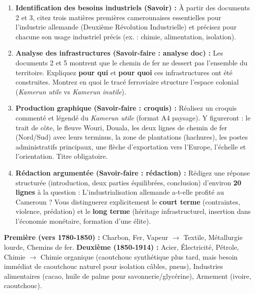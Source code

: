 \documentclass[11pt]{article}
\newcommand{\cle}[1]{{\popxbold\color{popdark}#1}}
\newcounter{popsec}
\newcounter{popsub}
\newcommand{\courssub}[1]{%
  \stepcounter{popsub}%
  \par\vspace{9pt}\noindent{\popxbold\fontsize{11.5}{13}\selectfont\color{popink}{\color{poporange}\thepopsec.\thepopsub}\hspace{6pt}#1}\par\nopagebreak\vspace{4pt}
}
\begin{document}
\begin{enumerate}
    \item \textbf{Identification des besoins industriels (Savoir) :} À partir des documents 2 et 3, citez trois matières premières camerounaises essentielles pour l'industrie allemande (\cle{Deuxième Révolution Industrielle}) et précisez pour chacune son usage industriel précis (ex. : chimie, alimentation, isolation).
    \item \textbf{Analyse des infrastructures (Savoir-faire : analyse doc) :} Les documents 2 et 5 montrent que le chemin de fer ne dessert pas l'ensemble du territoire. Expliquez \textbf{pour qui} et \textbf{pour quoi} ces infrastructures ont été construites. Montrez en quoi le tracé ferroviaire structure l'espace colonial (\emph{Kamerun utile} vs \emph{Kamerun inutile}).
    \item \textbf{Production graphique (Savoir-faire : croquis) :} Réalisez un croquis commenté et légendé du \emph{Kamerun utile} (format A4 paysage). Y figureront : le trait de côte, le fleuve Wouri, Douala, les deux lignes de chemin de fer (Nord/Sud) avec leurs terminus, la zone de plantations (hachures), les postes administratifs principaux, une flèche d'exportation vers l'Europe, l'échelle et l'orientation. Titre obligatoire.
    \item \textbf{Rédaction argumentée (Savoir-faire : rédaction) :} Rédigez une réponse structurée (introduction, deux parties équilibrées, conclusion) d'environ \textbf{20 lignes} à la question : \og L'industrialisation allemande a-t-elle profité au Cameroun ? \fg Vous distinguerez explicitement le \textbf{court terme} (contraintes, violence, prédation) et le \textbf{long terme} (héritage infrastructurel, insertion dans l'économie monétaire, formation d'une élite).
\end{enumerate}

\courssub{Ressources à mobiliser}
\begin{definition}
\textbf{Première (vers 1780-1850) :} Charbon, Fer, Vapeur $\rightarrow$ Textile, Métallurgie lourde, Chemins de fer.
\textbf{Deuxième (1850-1914) :} Acier, Électricité, Pétrole, Chimie $\rightarrow$ Chimie organique (caoutchouc synthétique plus tard, mais besoin immédiat de caoutchouc naturel pour isolation câbles, pneus), Industries alimentaires (cacao, huile de palme pour savonnerie/glycérine), Armement (ivoire, caoutchouc).
\end{definition}
\end{document}
